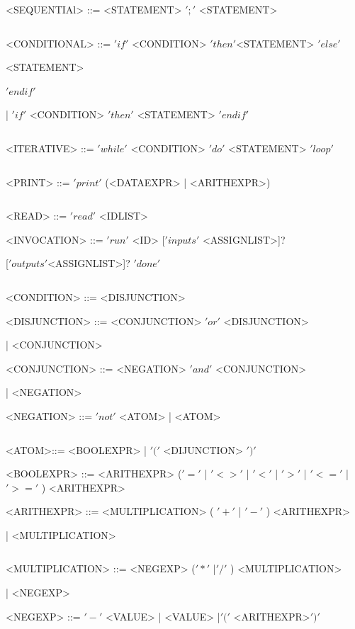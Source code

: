 \documentclass[a4paper]{article}
\begin{document}
$$ $$

<SEQUENTIAl> ::= <STATEMENT> $';'$ <STATEMENT>

$$ $$

<CONDITIONAL> ::= $'if'$ <CONDITION> $'then'$<STATEMENT> $'else'$ \newline \centerline {<STATEMENT>} \newline \centerline
{$'endif'$} \newline \centerline {
| $'if'$ <CONDITION> $'then'$ <STATEMENT> $'endif'$}

$$ $$

<ITERATIVE>  ::= $'while'$ <CONDITION> $'do'$ <STATEMENT> $'loop'$

$$ $$

<PRINT> ::= $'print'$ (<DATAEXPR> | <ARITHEXPR>)

$$ $$

<READ> ::= $'read'$ <IDLIST>

$$ $$
<INVOCATION> ::= $'run'$ <ID> [$'inputs'$ <ASSIGNLIST>]? \newline \centerline {[$'outputs'$<ASSIGNLIST>]? $'done'$}

$$ $$

\newpage

$$ $$
<CONDITION> ::= <DISJUNCTION>

$$ $$
 <DISJUNCTION> ::= <CONJUNCTION> $'or'$ <DISJUNCTION> \newline \centerline {|  <CONJUNCTION>}
 
 $$ $$ 
 <CONJUNCTION> ::= <NEGATION> $'and'$ <CONJUNCTION> \newline \centerline { | 
 <NEGATION>}
 
 $$ $$
 <NEGATION> ::= $'not'$ <ATOM> | <ATOM>
 
 $$ $$
 
 <ATOM>::= <BOOLEXPR> | $'('$ <DIJUNCTION> $')'$

$$ $$
<BOOLEXPR> ::= <ARITHEXPR> ($'='$ |  $'<>'$ | $'<'$ | $'>'$ | $'<='$ | $'>='$ ) <ARITHEXPR>

$$ $$ 
<ARITHEXPR> ::= <MULTIPLICATION> ( $'+'$  | $'-'$ ) <ARITHEXPR> \newline \centerline{ | <MULTIPLICATION>}

$$ $$

<MULTIPLICATION> ::= <NEGEXP> ($'*'$  |$'/'$ ) <MULTIPLICATION> \newline \centerline{ | <NEGEXP> }
$$ $$
<NEGEXP> ::= $'-'$ <VALUE> | <VALUE> |$'('$ <ARITHEXPR>$')'$

$$  $$
\end{document}
